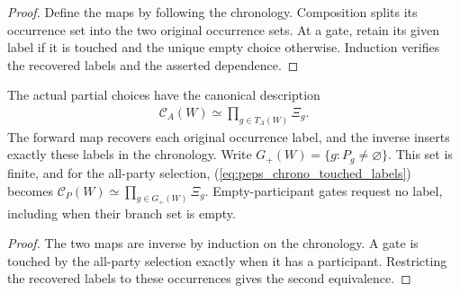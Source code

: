 \begin{proof}
    \leanok
    Define the maps by following the chronology. Composition splits its occurrence
    set into the two original occurrence sets. At a gate, retain its given label
    if it is touched and the unique empty choice otherwise. Induction verifies
    the recovered labels and the asserted dependence.
\end{proof}

\begin{definition}
    \label{def:peps_chrono_touched_labels}
    \leanok
    The actual partial choices have the canonical description
    \begin{align}
        \mathcal C_A(W)\simeq\prod_{g\in T_A(W)}\Xi_g.
        \label{eq:peps_chrono_touched_labels}
    \end{align}
    The forward map recovers each original occurrence label, and the inverse
    inserts exactly these labels in the chronology. Write
    $G_+(W)=\{g:P_g\ne\varnothing\}$. This set is finite, and for the all-party
    selection, (\ref{eq:peps_chrono_touched_labels}) becomes
    $\mathcal C_P(W)\simeq\prod_{g\in G_+(W)}\Xi_g$.
    Empty-participant gates request no label, including when their branch set
    is empty.
\end{definition}

\begin{proof}
    \leanok
    The two maps are inverse by induction on the chronology. A gate is touched
    by the all-party selection exactly when it has a participant. Restricting
    the recovered labels to these occurrences gives the second equivalence.
\end{proof}

